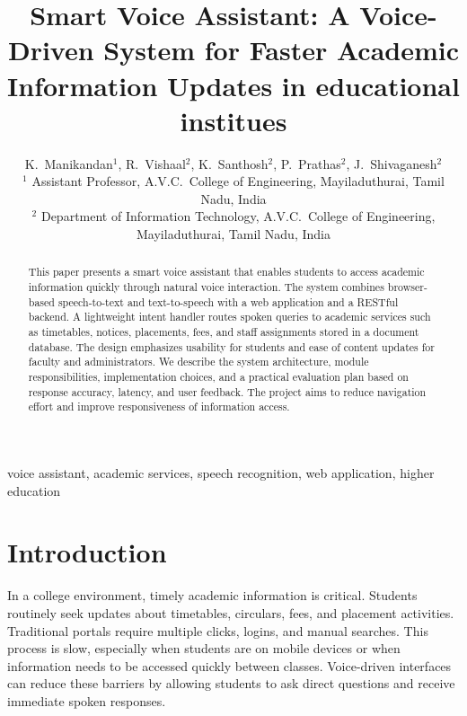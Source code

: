 ﻿\documentclass[conference]{IEEEtran}
\begin{document}
\title{Smart Voice Assistant: A Voice-Driven System for Faster Academic Information Updates in educational institues}

\author{
K.\ Manikandan$^{1}$, R.\ Vishaal$^{2}$, K.\ Santhosh$^{2}$, P.\ Prathas$^{2}$, J.\ Shivaganesh$^{2}$\\
$^{1}$ Assistant Professor, A.V.C.\ College of Engineering, Mayiladuthurai, Tamil Nadu, India\\
$^{2}$ Department of Information Technology, A.V.C.\ College of Engineering, Mayiladuthurai, Tamil Nadu, India
}

\maketitle

\begin{abstract}
This paper presents a smart voice assistant that enables students to access academic information quickly through natural voice interaction. The system combines browser-based speech-to-text and text-to-speech with a web application and a RESTful backend. A lightweight intent handler routes spoken queries to academic services such as timetables, notices, placements, fees, and staff assignments stored in a document database. The design emphasizes usability for students and ease of content updates for faculty and administrators. We describe the system architecture, module responsibilities, implementation choices, and a practical evaluation plan based on response accuracy, latency, and user feedback. The project aims to reduce navigation effort and improve responsiveness of information access.
\end{abstract}

\begin{IEEEkeywords}
voice assistant, academic services, speech recognition, web application, higher education
\end{IEEEkeywords}

\section{Introduction}
In a college environment, timely academic information is critical. Students routinely seek updates about timetables, circulars, fees, and placement activities. Traditional portals require multiple clicks, logins, and manual searches. This process is slow, especially when students are on mobile devices or when information needs to be accessed quickly between classes. Voice-driven interfaces can reduce these barriers by allowing students to ask direct questions and receive immediate spoken responses.
\end{document}
